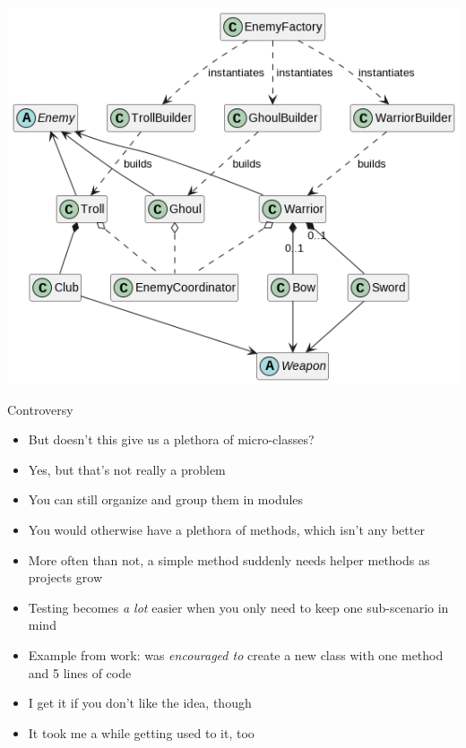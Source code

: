 
\begin{frame}
%
\begin{center}
\includegraphics[width=.65\linewidth]{./gfx/15-uml-big}
\end{center}
%
\end{frame}


\begin{frame}{Controversy}
%
\begin{itemize}
\item But doesn't this give us a plethora of micro-classes?
	\pause
\item Yes, but that's not really a problem
\item You can still organize and group them in modules
\item You would otherwise have a plethora of methods, which isn't any better
\item More often than not, a simple method suddenly needs helper methods as projects grow
\item Testing becomes \emph{a lot} easier when you only need to keep one sub-scenario in mind
	\pause
\item Example from work: was \emph{encouraged to} create a new class with one method and 5 lines of code
	\pause
\item I get it if you don't like the idea, though
\item It took me a while getting used to it, too
\end{itemize}
%
\end{frame}


